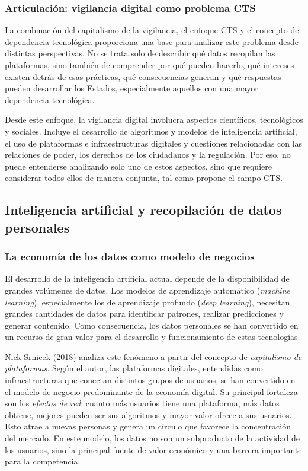 \documentclass[11pt,a4paper]{article}
\begin{document}
\subsubsection{Articulación: vigilancia digital como problema CTS}

La combinación del capitalismo de la vigilancia, el enfoque CTS y el concepto de dependencia tecnológica proporciona una base para analizar este problema desde distintas perspectivas. No se trata solo de describir qué datos recopilan las plataformas, sino también de comprender por qué pueden hacerlo, qué intereses existen detrás de esas prácticas, qué consecuencias generan y qué respuestas pueden desarrollar los Estados, especialmente aquellos con una mayor dependencia tecnológica.

Desde este enfoque, la vigilancia digital involucra aspectos científicos, tecnológicos y sociales. Incluye el desarrollo de algoritmos y modelos de inteligencia artificial, el uso de plataformas e infraestructuras digitales y cuestiones relacionadas con las relaciones de poder, los derechos de los ciudadanos y la regulación. Por eso, no puede entenderse analizando solo uno de estos aspectos, sino que requiere considerar todos ellos de manera conjunta, tal como propone el campo CTS.

\subsection{Inteligencia artificial y recopilación de datos personales}

\subsubsection{La economía de los datos como modelo de negocios}

El desarrollo de la inteligencia artificial actual depende de la disponibilidad de grandes volúmenes de datos. Los modelos de aprendizaje automático (\textit{machine learning}), especialmente los de aprendizaje profundo (\textit{deep learning}), necesitan grandes cantidades de datos para identificar patrones, realizar predicciones y generar contenido. Como consecuencia, los datos personales se han convertido en un recurso de gran valor para el desarrollo y funcionamiento de estas tecnologías.

Nick Srnicek (2018) analiza este fenómeno a partir del concepto de \textit{capitalismo de plataformas}. Según el autor, las plataformas digitales, entendidas como infraestructuras que conectan distintos grupos de usuarios, se han convertido en el modelo de negocio predominante de la economía digital. Su principal fortaleza son los \textit{efectos de red}: cuanto más usuarios tiene una plataforma, más datos obtiene, mejores pueden ser sus algoritmos y mayor valor ofrece a sus usuarios. Esto atrae a nuevas personas y genera un círculo que favorece la concentración del mercado. En este modelo, los datos no son un subproducto de la actividad de los usuarios, sino la principal fuente de valor económico y una barrera importante para la competencia.
\end{document}
